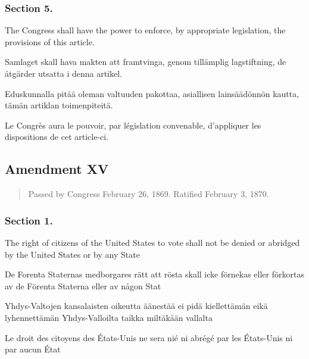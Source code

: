 \documentclass[a4,landscape,12pt]{article}
\begin{document}
\subsubsection*{Section 5.}
\begin{minipage}[t]{0.22\textwidth}
The Congress shall have the power to enforce, by appropriate legislation, the provisions of this article.
\end{minipage}\textwidth
\begin{minipage}[t]{0.22\textwidth}
Samlaget skall hava makten att framtvinga, genom tillämplig lagstiftning, de åtgärder utsatta i denna artikel.
\end{minipage}\textwidth
\begin{minipage}[t]{0.22\textwidth}
Eduskunnalla pitää oleman valtuuden pakottaa, asiallisen lainsäädönnön kautta, tämän artiklan toimenpiteitä.
\end{minipage}\textwidth
\begin{minipage}[t]{0.22\textwidth}
Le Congrès aura le pouvoir, par législation convenable, d'appliquer les dispositions de cet article-ci.
\end{minipage}



\subsection*{Amendment XV}
\begin{quote}\small
	Passed by Congress February 26, 1869. Ratified February 3, 1870.
\end{quote}

\subsubsection*{Section 1.}
\begin{minipage}[t]{0.22\textwidth}
	The right of citizens of the United States to vote shall not be denied or abridged by the United States or by any State
\end{minipage}\textwidth
\begin{minipage}[t]{0.22\textwidth}
	De Forenta Staternas medborgares rätt att rösta skall icke förnekas eller förkortas av de Förenta Staterna eller av någon Stat
\end{minipage}\textwidth
\begin{minipage}[t]{0.22\textwidth}
	Yhdys-Valtojen kansalaisten oikeutta äänestää ei pidä kiellettämän eikä lyhennettämän Yhdys-Valloilta taikka miltäkään vallalta
\end{minipage}\textwidth
\begin{minipage}[t]{0.22\textwidth}
	Le droit des citoyens des États-Unis ne sera nié ni abrégé par les États-Unis ni par aucun État
\end{minipage}
\end{document}
